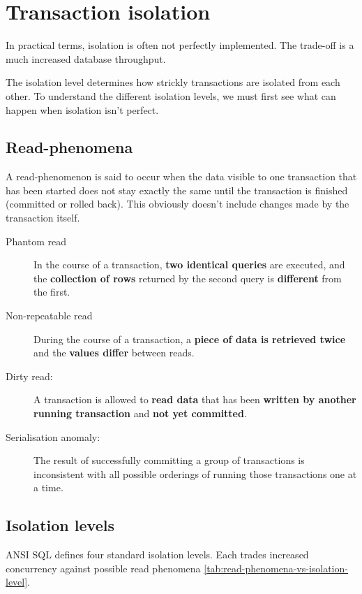 \section{Transaction isolation}
\label{sec:transaction-isolation}

In practical terms, isolation is often not perfectly implemented.
The trade-off is a much increased database throughput.

The isolation level determines how strickly transactions are isolated from each other.
To understand the different isolation levels, we must first see what can happen when isolation isn't perfect.

\subsection{Read-phenomena}

A read-phenomenon is said to occur when the data visible to one transaction that has been started does not stay exactly the same until the transaction is finished (committed or rolled back). 
This obviously doesn't include changes made by the transaction itself.

\begin{description}
\item[Phantom read] In the course of a transaction, \textbf{two identical queries} are executed, and the \textbf{collection of rows} returned by the second query is \textbf{different} from the first.
\item[Non-repeatable read] During the course of a transaction, a \textbf{piece of data is retrieved twice} and the \textbf{values differ} between reads.
\item[Dirty read:] A transaction is allowed to \textbf{read data} that has been \textbf{written by another running transaction} and \textbf{not yet committed}.
\item[Serialisation anomaly:] The result of successfully committing a group of transactions is inconsistent with all possible orderings of running those transactions one at a time.
\end{description}
  
\subsection{Isolation levels}

ANSI SQL defines four standard isolation levels.
Each trades increased concurrency against possible read phenomena \autoref{tab:read-phenomena-vs-isolation-level}.

